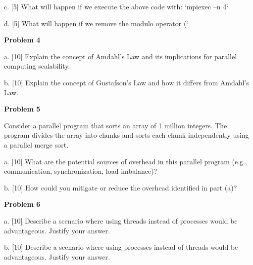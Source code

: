 \documentclass{article}
\begin{document}
c. [5] What will happen if we execute the above code with: `mpiexec –n 4`

d. [5] What will happen if we remove the modulo operator (`%


\textbf{Problem 4}

a. [10] Explain the concept of Amdahl's Law and its implications for parallel computing scalability.

b. [10]  Explain the concept of Gustafson's Law and how it differs from Amdahl's Law.


\textbf{Problem 5}

Consider a parallel program that sorts an array of 1 million integers.  The program divides the array into chunks and sorts each chunk independently using a parallel merge sort.

a. [10] What are the potential sources of overhead in this parallel program (e.g., communication, synchronization, load imbalance)?

b. [10] How could you mitigate or reduce the overhead identified in part (a)?


\textbf{Problem 6}

a. [10] Describe a scenario where using threads instead of processes would be advantageous. Justify your answer.

b. [10] Describe a scenario where using processes instead of threads would be advantageous. Justify your answer.
\end{document}
